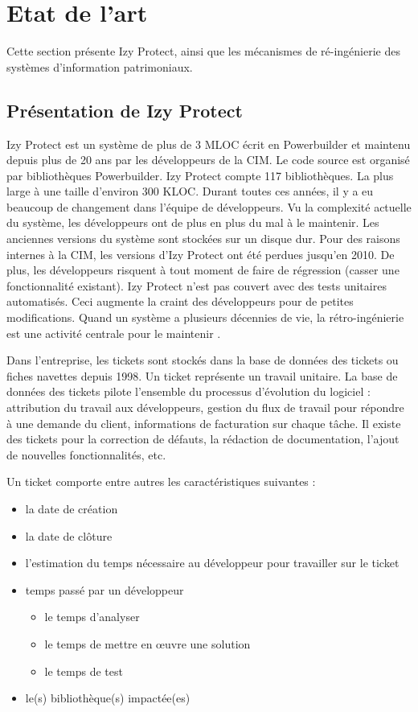 \documentclass[a4paper]{article}
\begin{document}
\section{Etat de l'art}
\label{sec:stateOfTheArt}

Cette section présente Izy Protect, ainsi que les mécanismes de ré-ingénierie des systèmes d'information patrimoniaux.
\subsection{Présentation de Izy Protect}
\label{sec:izyProtect}
Izy Protect est un système de plus de 3 MLOC écrit en Powerbuilder et maintenu depuis plus de 20 ans par les développeurs de la CIM.
 Le code source est organisé par bibliothèques Powerbuilder. 
Izy Protect compte 117 bibliothèques.
 La plus large à une taille d'environ 300 KLOC.
Durant toutes ces années, il y a eu beaucoup de changement dans l'équipe de développeurs. 
Vu la complexité actuelle du système, les développeurs ont de plus en plus du mal à le maintenir.
Les anciennes versions du système sont stockées sur un disque dur.
 Pour des raisons internes à la CIM, les versions d'Izy Protect ont été perdues jusqu'en 2010. 
 De plus, les développeurs risquent à tout moment de faire de régression (casser une fonctionnalité existant). 
Izy Protect  n'est pas couvert avec des tests unitaires automatisés.
Ceci augmente la craint des développeurs pour de petites modifications. 
Quand un système a plusieurs décennies de vie, la rétro-ingénierie est une activité centrale pour le maintenir \cite{Deme02a}.

Dans l'entreprise, les tickets sont stockés dans la base de données des tickets ou fiches navettes depuis 1998. 
Un ticket représente un travail unitaire.
La base de données des tickets pilote l'ensemble du processus d'évolution du logiciel : attribution du travail aux développeurs, gestion du flux de travail pour répondre à une demande du client, informations de facturation sur chaque tâche.
Il existe des tickets pour la correction de défauts, la rédaction de documentation, l'ajout de nouvelles fonctionnalités, etc. 

Un ticket comporte entre autres les caractéristiques suivantes :

\begin{itemize}
\item la date de création
\item la date de clôture
\item l'estimation du temps nécessaire au développeur pour travailler sur le ticket
\item temps passé par un développeur
\begin{itemize}
\item le temps d'analyser
\item le temps de mettre en œuvre une solution
\item le temps de test
\end{itemize}
\item le(s) bibliothèque(s) impactée(es)
\end{itemize}
\end{document}
